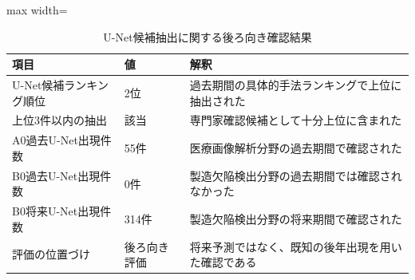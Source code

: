 \begin{table}[tbp]
\centering
\small
\caption{U-Net候補抽出に関する後ろ向き確認結果}
\label{tab:experiment1_evaluation_summary_table}
\begin{adjustbox}{max width=\textwidth}
\begin{tabular}{lll}
\toprule
項目 & 値 & 解釈 \\
\midrule
U-Net候補ランキング順位 & 2位 & 過去期間の具体的手法ランキングで上位に抽出された \\
上位3件以内の抽出 & 該当 & 専門家確認候補として十分上位に含まれた \\
A0過去U-Net出現件数 & 55件 & 医療画像解析分野の過去期間で確認された \\
B0過去U-Net出現件数 & 0件 & 製造欠陥検出分野の過去期間では確認されなかった \\
B0将来U-Net出現件数 & 314件 & 製造欠陥検出分野の将来期間で確認された \\
評価の位置づけ & 後ろ向き評価 & 将来予測ではなく、既知の後年出現を用いた確認である \\
\bottomrule
\end{tabular}
\end{adjustbox}
\end{table}
